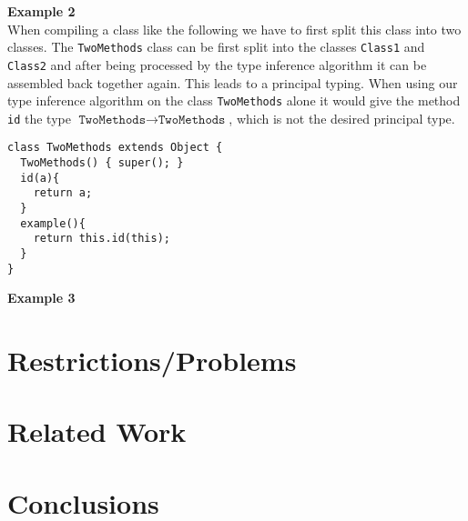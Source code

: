 \documentclass[acmsmall,screen,review]{acmart}
\begin{document}
\textbf{Example 2}\\
When compiling a class like the following
we have to first split this class into two classes.
The \texttt{TwoMethods} class can be first split into the classes \texttt{Class1}
and \texttt{Class2} and after being processed by the type inference algorithm it can be assembled back together again.
This leads to a principal typing.
When using our type inference algorithm on the class \texttt{TwoMethods} alone
it would give the method \texttt{id} the type $\texttt{TwoMethods} \to \texttt{TwoMethods}$,
which is not the desired principal type.
\begin{lstlisting}
class TwoMethods extends Object {
  TwoMethods() { super(); }
  id(a){
    return a;
  }
  example(){
    return this.id(this);
  }
}
\end{lstlisting}

\textbf{Example 3}\\


\section{Restrictions/Problems}

\section{Related Work}


\section{Conclusions}
\label{sec:conclusions}




\end{document}
